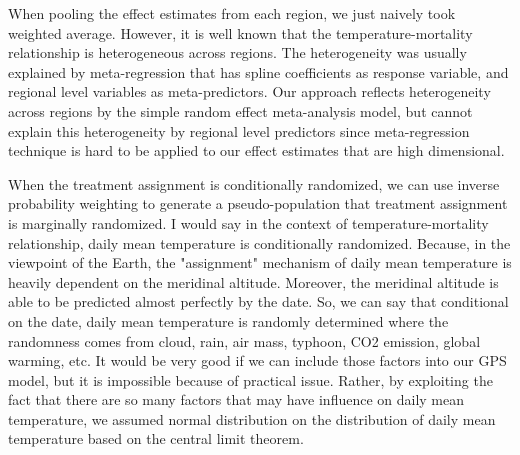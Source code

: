 \documentclass[12pt]{article}
\begin{document}
When pooling the effect estimates from each region, we just naively took weighted average.
However, it is well known that the temperature-mortality relationship is heterogeneous across regions.
The heterogeneity was usually explained by meta-regression
that has spline coefficients as response variable, and regional level variables as meta-predictors.
Our approach reflects heterogeneity across regions by the simple random effect meta-analysis model, 
but cannot explain this heterogeneity by regional level predictors
since meta-regression technique is hard to be applied to our effect estimates that are high dimensional.

When the treatment assignment is conditionally randomized, 
we can use inverse probability weighting to generate a pseudo-population
that treatment assignment is marginally randomized.
I would say in the context of temperature-mortality relationship,
daily mean temperature is conditionally randomized.
Because, in the viewpoint of the Earth, 
the "assignment" mechanism of daily mean temperature is heavily dependent on the meridinal altitude.
Moreover, the meridinal altitude is able to be predicted almost perfectly by the date.
So, we can say that conditional on the date, daily mean temperature is randomly determined
where the randomness comes from cloud, rain, air mass, typhoon, CO2 emission, global warming, etc.
It would be very good if we can include those factors into our GPS model,
but it is impossible because of practical issue.
Rather, by exploiting the fact that 
there are so many factors that may have influence on daily mean temperature,
we assumed normal distribution on the distribution of daily mean temperature 
based on the central limit theorem.

{}

\end{document}
